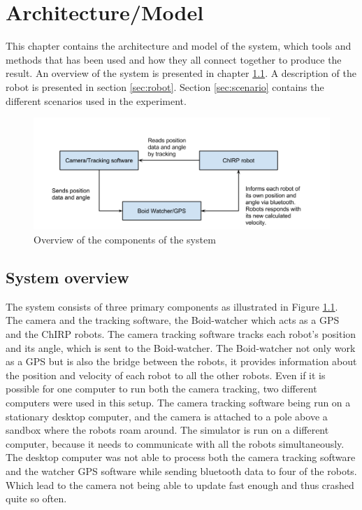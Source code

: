 \chapter{Architecture/Model}
\label{sec:architectureAndModel}
This chapter contains the architecture and model of the system, which tools and methods that has been used and how they all connect together to produce the result.
An overview of the system is presented in chapter \ref{sec:overview}. A description of the robot is presented in section \ref{sec:robot}. Section \ref{sec:scenario} contains the different scenarios used in the experiment.

\begin{figure}[h]
\label{fig:overview}
\begin{center}
\includegraphics[width=\linewidth]{figs/system_overview}
\end{center}
\caption[System overview]{Overview of the components of the system}
\end{figure}

\section{System overview}
\label{sec:overview}
The system consists of three primary components as illustrated in Figure \ref{fig:overview}. The camera and the tracking software, the Boid-watcher which acts as a GPS and the ChIRP robots.
The camera tracking software tracks each robot's position and its angle, which is sent to the Boid-watcher. The Boid-watcher not only work as a GPS but is also the bridge between the robots, it provides information about the position and velocity of each robot to all the other robots.
Even if it is possible for one computer to run both the camera tracking, two different computers were used in this setup. The camera tracking software being run on a stationary desktop computer, and the camera is attached to a pole above a sandbox where the robots roam around. The simulator is run on a different computer, because it needs to communicate with all the robots simultaneously. The desktop computer was not able to process both the camera tracking software and the watcher GPS software while sending bluetooth data to four of the robots. Which lead to the camera not being able to update fast enough and thus crashed quite so often.

